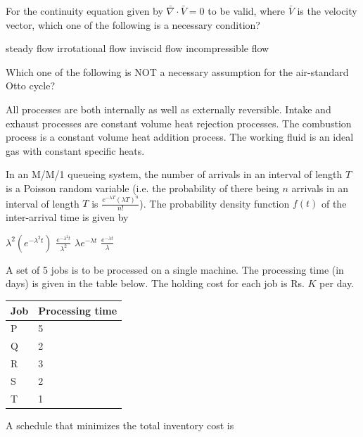 \documentclass[addpoints,11pt]{exam}
\begin{document}
\begin{questions}
    \pagebreak

    \question For the continuity equation given by $\bar{\nabla}\cdot\bar{V} = 0$ to be valid, where $\bar{V}$ is the velocity vector, which one of the following is a necessary condition?

    \begin{choices}
        \choice steady flow
        \choice irrotational flow
        \choice inviscid flow
        \choice incompressible flow
    \end{choices}

    \question Which one of the following is NOT a necessary assumption for the air-standard Otto cycle?

    \begin{choices}
        \choice All processes are both internally as well as externally reversible.
        \choice Intake and exhaust processes are constant volume heat rejection processes.
        \choice The combustion process is a constant volume heat addition process.
        \choice The working fluid is an ideal gas with constant specific heats.
    \end{choices}

    \question In an M/M/1 queueing system, the number of arrivals in an interval of length $T$ is a Poisson random variable (i.e. the probability of there being $n$ arrivals in an interval of length $T$ is $\frac{e^{-\lambda T}(\lambda T)^n}{n!}$). The probability density function $f(t)$ of the inter-arrival time is given by

    \begin{oneparchoices}
        \choice $\lambda^2(e^{-\lambda^2t})$
        \choice $\frac{e^{-\lambda^2t}}{\lambda^2}$
        \choice $\lambda e^{-\lambda t}$
        \choice $\frac{e^{-\lambda t}}{\lambda}$
    \end{oneparchoices}

    \question A set of 5 jobs is to be processed on a single machine. The processing time (in days) is given in the table below. The holding cost for each job is Rs. $K$ per day.\\
    \begin{center}
        \begin{tabular}{|l|l|}
            \hline
            \textbf{Job} & \textbf{Processing time} \\
            \hline
            P            & 5                        \\\hline
            Q            & 2                        \\\hline
            R            & 3                        \\\hline
            S            & 2                        \\\hline
            T            & 1                        \\\hline
        \end{tabular}
    \end{center}
    A schedule that minimizes the total inventory cost is


\end{questions}
\end{document}
